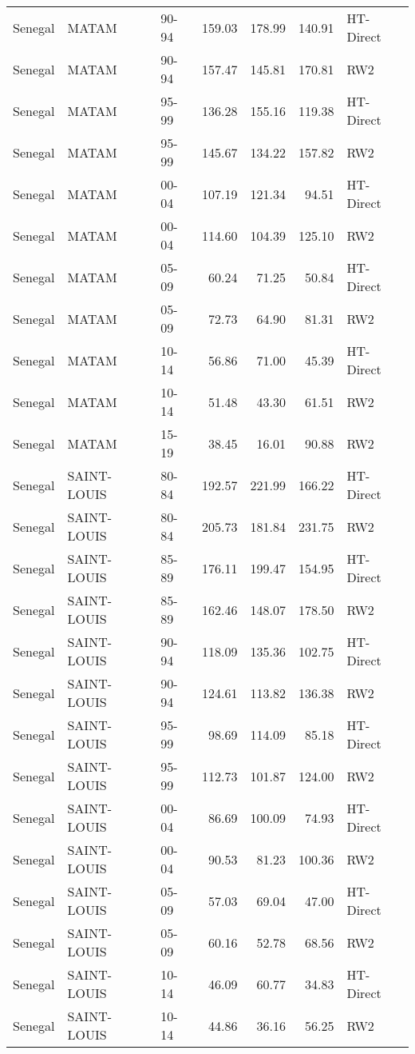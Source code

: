 \begin{longtable}{lllrrrl}
  Senegal & MATAM & 90-94 & 159.03 & 178.99 & 140.91 & HT-Direct \\ 
  Senegal & MATAM & 90-94 & 157.47 & 145.81 & 170.81 & RW2 \\ 
  Senegal & MATAM & 95-99 & 136.28 & 155.16 & 119.38 & HT-Direct \\ 
  Senegal & MATAM & 95-99 & 145.67 & 134.22 & 157.82 & RW2 \\ 
  Senegal & MATAM & 00-04 & 107.19 & 121.34 & 94.51 & HT-Direct \\ 
  Senegal & MATAM & 00-04 & 114.60 & 104.39 & 125.10 & RW2 \\ 
  Senegal & MATAM & 05-09 & 60.24 & 71.25 & 50.84 & HT-Direct \\ 
  Senegal & MATAM & 05-09 & 72.73 & 64.90 & 81.31 & RW2 \\ 
  Senegal & MATAM & 10-14 & 56.86 & 71.00 & 45.39 & HT-Direct \\ 
  Senegal & MATAM & 10-14 & 51.48 & 43.30 & 61.51 & RW2 \\ 
  Senegal & MATAM & 15-19 & 38.45 & 16.01 & 90.88 & RW2 \\ 
  Senegal & SAINT-LOUIS & 80-84 & 192.57 & 221.99 & 166.22 & HT-Direct \\ 
  Senegal & SAINT-LOUIS & 80-84 & 205.73 & 181.84 & 231.75 & RW2 \\ 
  Senegal & SAINT-LOUIS & 85-89 & 176.11 & 199.47 & 154.95 & HT-Direct \\ 
  Senegal & SAINT-LOUIS & 85-89 & 162.46 & 148.07 & 178.50 & RW2 \\ 
  Senegal & SAINT-LOUIS & 90-94 & 118.09 & 135.36 & 102.75 & HT-Direct \\ 
  Senegal & SAINT-LOUIS & 90-94 & 124.61 & 113.82 & 136.38 & RW2 \\ 
  Senegal & SAINT-LOUIS & 95-99 & 98.69 & 114.09 & 85.18 & HT-Direct \\ 
  Senegal & SAINT-LOUIS & 95-99 & 112.73 & 101.87 & 124.00 & RW2 \\ 
  Senegal & SAINT-LOUIS & 00-04 & 86.69 & 100.09 & 74.93 & HT-Direct \\ 
  Senegal & SAINT-LOUIS & 00-04 & 90.53 & 81.23 & 100.36 & RW2 \\ 
  Senegal & SAINT-LOUIS & 05-09 & 57.03 & 69.04 & 47.00 & HT-Direct \\ 
  Senegal & SAINT-LOUIS & 05-09 & 60.16 & 52.78 & 68.56 & RW2 \\ 
  Senegal & SAINT-LOUIS & 10-14 & 46.09 & 60.77 & 34.83 & HT-Direct \\ 
  Senegal & SAINT-LOUIS & 10-14 & 44.86 & 36.16 & 56.25 & RW2 \\ 

\end{longtable}
